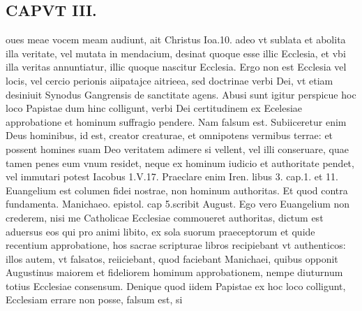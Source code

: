 \documentclass{article}
\begin{document}
\begin{pages}
\section*{CAPVT  III. }
\marginpar{[ p.172 ]}\pstart oues meae vocem meam audiunt, ait Christus Ioa.10. adeo vt sublata et abolita illa veritate, vel mutata in mendacium, desinat quoque esse illic Ecclesia, et vbi illa veritas annuntiatur, illic quoque nascitur Ecclesia. Ergo non est Ecclesia vel locis, vel cercio perionis aiipatajce aitrieea, sed doctrinae verbi Dei, vt etiam desiniuit Synodus Gangrensis de sanctitate agens.  \pend\pstart Abusi sunt igitur perspicue hoc loco Papistae dum hinc colligunt, verbi Dei certitudinem ex Ecelesiae approbatione et hominum suffragio pendere. Nam falsum est. Subiiceretur enim Deus hominibus, id est, creator creaturae, et omnipotens vermibus terrae: et possent homines suam Deo veritatem adimere si vellent, vel illi conseruare, quae tamen penes eum vnum residet, neque ex hominum iudicio et authoritate pendet, vel immutari potest Iacobus 1.V.17. Praeclare enim Iren. libus 3. cap.1. et 11. Euangelium est columen fidei nostrae, non hominum authoritas. Et quod contra fundamenta. Manichaeo. epistol. cap 5.scribit August. Ego vero Euangelium non crederem, nisi me Catholicae Ecclesiae commoueret authoritas, dictum est aduersus eos qui pro animi libito, ex sola suorum praeceptorum et quide recentium approbatione, hos sacrae scripturae libros recipiebant vt authenticos: illos autem, vt falsatos, reiiciebant, quod faciebant Manichaei, quibus opponit Augustinus maiorem et fideliorem hominum approbationem, nempe diuturnum totius Ecclesiae consensum.  \pend\pstart Denique quod iidem Papistae ex hoc loco colligunt, Ecclesiam errare non posse, falsum est, si  \pend

\end{pages}
\end{document}
